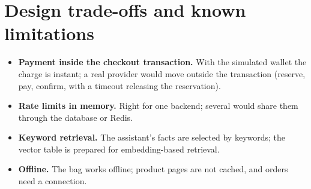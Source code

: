 \ifaideclaration

\fi

\section{Design trade-offs and known limitations}

\begin{itemize}
	\item \textbf{Payment inside the checkout transaction.} With the simulated wallet the charge is instant; a real
	provider would move outside the transaction (reserve, pay, confirm, with a timeout releasing the reservation).
	\item \textbf{Rate limits in memory.} Right for one backend; several would share them through the database or Redis.
	\item \textbf{Keyword retrieval.} The assistant's facts are selected by keywords; the vector table is prepared for
	embedding-based retrieval.
	\item \textbf{Offline.} The bag works offline; product pages are not cached, and orders need a connection.
\end{itemize}
